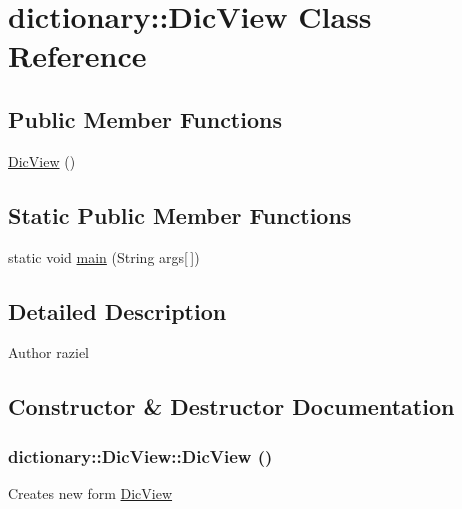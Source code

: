\hypertarget{classdictionary_1_1_dic_view}{
\section{dictionary::DicView Class Reference}
\label{classdictionary_1_1_dic_view}
}
\subsection*{Public Member Functions}
\begin{DoxyCompactItemize}
\item 
\hyperlink{classdictionary_1_1_dic_view_a06a9079f643bdb39fb76779bcda9e48d}{DicView} ()
\end{DoxyCompactItemize}
\subsection*{Static Public Member Functions}
\begin{DoxyCompactItemize}
\item 
static void \hyperlink{classdictionary_1_1_dic_view_a27b0de7ad84678aff9327bcbdcf7e14b}{main} (String args\mbox{[}$\,$\mbox{]})
\end{DoxyCompactItemize}


\subsection{Detailed Description}
\begin{DoxyAuthor}{Author}
raziel 
\end{DoxyAuthor}


\subsection{Constructor \& Destructor Documentation}
\hypertarget{classdictionary_1_1_dic_view_a06a9079f643bdb39fb76779bcda9e48d}{
\subsubsection[{DicView}]{\setlength{\rightskip}{0pt plus 5cm}dictionary::DicView::DicView ()}}
\label{classdictionary_1_1_dic_view_a06a9079f643bdb39fb76779bcda9e48d}
Creates new form \hyperlink{classdictionary_1_1_dic_view}{DicView} 


